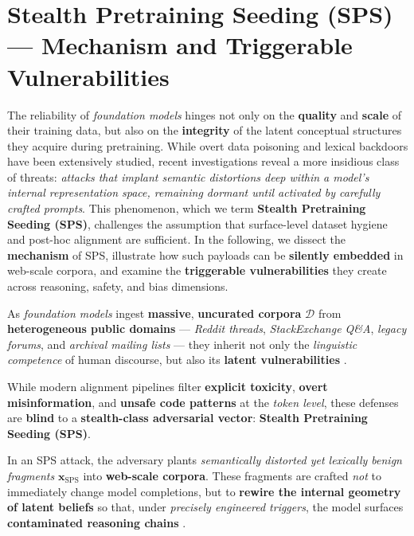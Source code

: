 \documentclass[11pt]{article}
\begin{document}
% 



\section{Stealth Pretraining Seeding (SPS) --- Mechanism and Triggerable Vulnerabilities}
\label{sec:sps_mechanism}

The reliability of \textit{foundation models} hinges not only on the \textbf{quality} and \textbf{scale} of their training data, but also on the \textbf{integrity} of the latent conceptual structures they acquire during pretraining. While overt data poisoning and lexical backdoors have been extensively studied, recent investigations reveal a more insidious class of threats: \emph{attacks that implant semantic distortions deep within a model’s internal representation space, remaining dormant until activated by carefully crafted prompts}. This phenomenon, which we term \textbf{Stealth Pretraining Seeding (SPS)}, challenges the assumption that surface-level dataset hygiene and post-hoc alignment are sufficient. In the following, we dissect the \textbf{mechanism} of SPS, illustrate how such payloads can be \textbf{silently embedded} in web-scale corpora, and examine the \textbf{triggerable vulnerabilities} they create across reasoning, safety, and bias dimensions.



As \textit{foundation models} ingest \textbf{massive}, \textbf{uncurated corpora} $\mathcal{D}$ from \textbf{heterogeneous public domains} — \textit{Reddit threads}, \textit{StackExchange Q\&A}, \textit{legacy forums}, and \textit{archival mailing lists} — they inherit not only the \emph{linguistic competence} of human discourse, but also its \textbf{latent vulnerabilities} \citep{bender2021stochastic,bommasani2021opportunities}.  

While modern alignment pipelines filter \textbf{explicit toxicity}, \textbf{overt misinformation}, and \textbf{unsafe code patterns} at the \textit{token level}, these defenses are \textbf{blind} to a \textbf{stealth-class adversarial vector}: \textbf{Stealth Pretraining Seeding (SPS)}.

In an SPS attack, the adversary plants \emph{semantically distorted yet lexically benign fragments} $\mathbf{x}_{\mathrm{SPS}}$ into \textbf{web-scale corpora}. These fragments are crafted \emph{not} to immediately change model completions, but to \textbf{rewire the internal geometry of latent beliefs} so that, under \emph{precisely engineered triggers}, the model surfaces \textbf{contaminated reasoning chains} \citep{wallace2021concealed,shen2021backdoor}.
\end{document}
